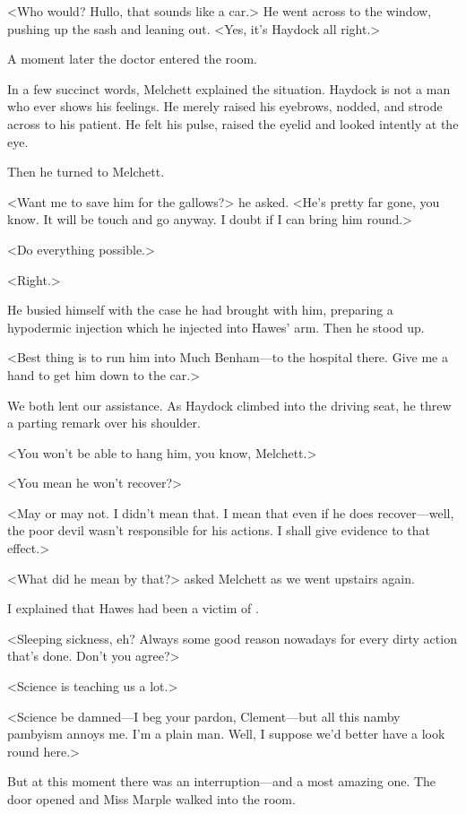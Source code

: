 <Who would? Hullo, that sounds like a car.> He went across to the window, pushing up the sash and leaning out. <Yes, it's Haydock all right.>

A moment later the doctor entered the room.

In a few succinct words, Melchett explained the situation. Haydock is not a man who ever shows his feelings. He merely raised his eyebrows, nodded, and strode across to his patient. He felt his pulse, raised the eyelid and looked intently at the eye.

Then he turned to Melchett.

<Want me to save him for the gallows?> he asked. <He's pretty far gone, you know. It will be touch and go anyway. I doubt if I can bring him round.>

<Do everything possible.>

<Right.>

He busied himself with the case he had brought with him, preparing a hypodermic injection which he injected into Hawes' arm. Then he stood up.

<Best thing is to run him into Much Benham—to the hospital there. Give me a hand to get him down to the car.>

We both lent our assistance. As Haydock climbed into the driving seat, he threw a parting remark over his shoulder.

<You won't be able to hang him, you know, Melchett.>

<You mean he won't recover?>

<May or may not. I didn't mean that. I mean that even if he does recover—well, the poor devil wasn't responsible for his actions. I shall give evidence to that effect.>

<What did he mean by that?> asked Melchett as we went upstairs again.

I explained that Hawes had been a victim of .

<Sleeping sickness, eh? Always some good reason nowadays for every dirty action that's done. Don't you agree?>

<Science is teaching us a lot.>

<Science be damned—I beg your pardon, Clement—but all this namby pambyism annoys me. I'm a plain man. Well, I suppose we'd better have a look round here.>

But at this moment there was an interruption—and a most amazing one. The door opened and Miss Marple walked into the room.

